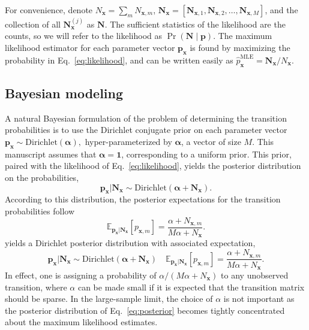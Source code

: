 \documentclass{IOS-Book-Article}
\newcommand{\bN}{\mathbf{N}}
\newcommand{\bx}{\mathbf{x}}
\newcommand{\bp}{\mathbf{p}}
\begin{document}
For convenience,  denote $N_{\bx} =\sum_{m}N_{\bx,m}$,  $\bN_{\bx}= [\bN_{\bx,1},\bN_{\bx,2},\ldots,\bN_{\bx,M}]$, and the collection of all $\bN^{(j)}_{\bx}$ as $\bN$. The sufficient statistics of the likelihood are the counts, so we will refer to the likelihood as $\Pr(\bN\mid\bp)$. The maximum likelihood estimator for each parameter vector $\bp_\bx$ is found by maximizing the probability in Eq.~\ref{eq:likelihood}, and can be written easily as
$\hat{p}^{\textrm{MLE}}_{\bx} = \mathbf{N}_{\bx} / N_{\bx}$. 


\subsection{Bayesian modeling}

A natural Bayesian formulation of the
problem of determining the transition probabilities is to use the Dirichlet conjugate prior
on each parameter vector
$
\mathbf{p}_{\bx} \sim \mathrm{Dirichlet}(\boldsymbol\alpha),
$
 hyper-parameterized by $\boldsymbol\alpha$, a vector of size $M$. This manuscript assumes that $\boldsymbol\alpha=\mathbf{1}$, corresponding to a uniform prior. This prior, paired with the likelihood of Eq.~\ref{eq:likelihood}, 
 yields the posterior distribution on the probabilities,
\begin{equation}
\mathbf{p}_{\bx}  \vert \mathbf{N}_{\bx} \sim \mathrm{Dirichlet}(\boldsymbol\alpha + \mathbf{N}_{\bx} ).
\label{eq:posterior}
\end{equation}
According to this distribution, the posterior expectations for the transition probabilities follow
\begin{equation}
\mathbb{E}_{\bp_\bx\vert\bN_\bx} [p_{\bx,m}] = \frac{\alpha + N_{\bx,m}}{M\alpha+ N_{\bx}}.
\end{equation}
yields a  Dirichlet posterior distribution
 with associated expectation,
\begin{equation}
\mathbf{p}_{\bx}  \vert \mathbf{N}_{\bx} \sim \mathrm{Dirichlet}(\boldsymbol\alpha + \mathbf{N}_{\bx} ) \quad \mathbb{E}_{\bp_\bx\vert\bN_\bx} [p_{\bx,m}] = \frac{\alpha + N_{\bx,m}}{M\alpha+ N_{\bx}}.\label{eq:posterior}
\end{equation}
In effect, one is assigning a probability of $\alpha/(M\alpha+N_{\bx})$ to any unobserved transition, where $\alpha$ can be made small if it is expected that the transition matrix should be sparse.   In the large-sample limit, the choice of $\alpha$ is not important as the posterior distribution of Eq.~\ref{eq:posterior}  becomes tightly concentrated about the maximum likelihood estimates.
\end{document}
